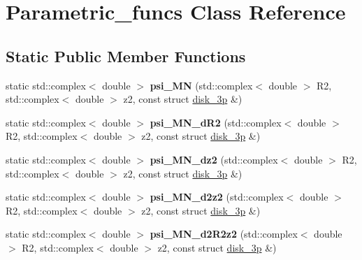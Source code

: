 \hypertarget{classParametric__funcs}{}\section{Parametric\+\_\+funcs Class Reference}
\label{classParametric__funcs}
\subsection*{Static Public Member Functions}
\begin{DoxyCompactItemize}
\item 
\mbox{\label{classParametric__funcs_a63fbb6aed4d72b75e8136365805404f6}} 
static std\+::complex$<$ double $>$ {\bfseries psi\+\_\+\+MN} (std\+::complex$<$ double $>$ R2, std\+::complex$<$ double $>$ z2, const struct \hyperlink{structdisk__3p}{disk\+\_\+3p} \&)
\item 
\mbox{\label{classParametric__funcs_a9835569f87964f0dad32a23d6a43a387}} 
static std\+::complex$<$ double $>$ {\bfseries psi\+\_\+\+M\+N\+\_\+d\+R2} (std\+::complex$<$ double $>$ R2, std\+::complex$<$ double $>$ z2, const struct \hyperlink{structdisk__3p}{disk\+\_\+3p} \&)
\item 
\mbox{\label{classParametric__funcs_a2bea359cc13f4f6beecdf0b1da8de868}} 
static std\+::complex$<$ double $>$ {\bfseries psi\+\_\+\+M\+N\+\_\+dz2} (std\+::complex$<$ double $>$ R2, std\+::complex$<$ double $>$ z2, const struct \hyperlink{structdisk__3p}{disk\+\_\+3p} \&)
\item 
\mbox{\label{classParametric__funcs_afa840a39017db2163e9330f983e1558b}} 
static std\+::complex$<$ double $>$ {\bfseries psi\+\_\+\+M\+N\+\_\+d2z2} (std\+::complex$<$ double $>$ R2, std\+::complex$<$ double $>$ z2, const struct \hyperlink{structdisk__3p}{disk\+\_\+3p} \&)
\item 
\mbox{\label{classParametric__funcs_a92016aa86c23afb7aaa99f0bdf466962}} 
static std\+::complex$<$ double $>$ {\bfseries psi\+\_\+\+M\+N\+\_\+d2\+R2z2} (std\+::complex$<$ double $>$ R2, std\+::complex$<$ double $>$ z2, const struct \hyperlink{structdisk__3p}{disk\+\_\+3p} \&)
\item 
\mbox{\label{classParametric__funcs_a4ef64b9bbc8c109f4e3986bb425342f3}} 

\end{DoxyCompactItemize}
